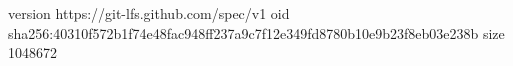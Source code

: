 version https://git-lfs.github.com/spec/v1
oid sha256:40310f572b1f74e48fac948ff237a9c7f12e349fd8780b10e9b23f8eb03e238b
size 1048672
